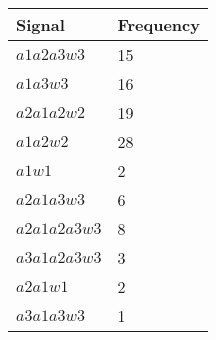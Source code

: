 \begin{center}
	\begin{tabular}{ || m{3cm}| m{3cm} || } 
	\hline
	Signal & Frequency\\ 
	\hline \hline
	$a1a2a3w3$ & \num{15}\\
	$a1a3w3$ & \num{16}\\
	$a2a1a2w2$ & \num{19}\\
	$a1a2w2$ & \num{28}\\
	$a1w1$ & \num{2}\\
	$a2a1a3w3$ & \num{6}\\
	$a2a1a2a3w3$ & \num{8}\\
	$a3a1a2a3w3$ & \num{3}\\
	$a2a1w1$ & \num{2}\\
	$a3a1a3w3$ & \num{1}\\
	\hline
	\end{tabular}
\end{center}


